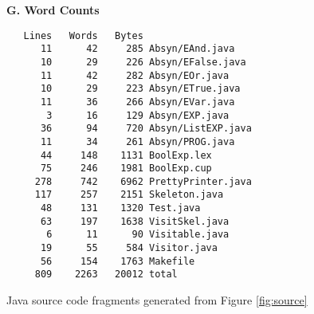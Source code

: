 \begin{figure}
\begin{boxedminipage}[t]{\textwidth}
\begin{minipage}[r]{0.5\textwidth}
\textbf{G. Word Counts}
\scriptsize
\begin{verbatim}
   Lines   Words   Bytes
      11      42     285 Absyn/EAnd.java
      10      29     226 Absyn/EFalse.java
      11      42     282 Absyn/EOr.java
      10      29     223 Absyn/ETrue.java
      11      36     266 Absyn/EVar.java
       3      16     129 Absyn/EXP.java
      36      94     720 Absyn/ListEXP.java
      11      34     261 Absyn/PROG.java
      44     148    1131 BoolExp.lex
      75     246    1981 BoolExp.cup
     278     742    6962 PrettyPrinter.java
     117     257    2151 Skeleton.java
      48     131    1320 Test.java
      63     197    1638 VisitSkel.java
       6      11      90 Visitable.java
      19      55     584 Visitor.java
      56     154    1763 Makefile
     809    2263   20012 total
\end{verbatim}
\normalsize
\hfill
\end{minipage}
\end{boxedminipage}
\caption{Java source code fragments generated from Figure \ref{fig:source}}
\label{fig:java}
\end{figure}

